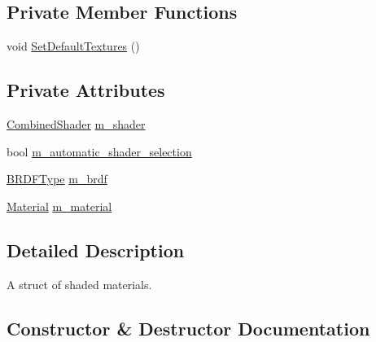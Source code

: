 \subsection*{Private Member Functions}
\begin{DoxyCompactItemize}
\item 
void \hyperlink{structmage_1_1_shaded_material_afbd4b9d4a2f348124c08c005a712477d}{Set\+Default\+Textures} ()
\end{DoxyCompactItemize}
\subsection*{Private Attributes}
\begin{DoxyCompactItemize}
\item 
\hyperlink{structmage_1_1_combined_shader}{Combined\+Shader} \hyperlink{structmage_1_1_shaded_material_a712d07ac1995ff592bbb8ab20a294270}{m\+\_\+shader}
\item 
bool \hyperlink{structmage_1_1_shaded_material_a744f6e4c0318f29f343039d6be072b66}{m\+\_\+automatic\+\_\+shader\+\_\+selection}
\item 
\hyperlink{namespacemage_ae7a7a03a7b34d7e2689689bb8295cd38}{B\+R\+D\+F\+Type} \hyperlink{structmage_1_1_shaded_material_a59a4b0ecb6ab1d60a285e0f1f69b5e36}{m\+\_\+brdf}
\item 
\hyperlink{structmage_1_1_material}{Material} \hyperlink{structmage_1_1_shaded_material_a319e1ca2103c50f84ce0605b08bd34b4}{m\+\_\+material}
\end{DoxyCompactItemize}


\subsection{Detailed Description}
A struct of shaded materials. 

\subsection{Constructor \& Destructor Documentation}
\hypertarget{structmage_1_1_shaded_material_a3b00f6ba8fc8a47e188b6adf28cc3460}{}\label{structmage_1_1_shaded_material_a3b00f6ba8fc8a47e188b6adf28cc3460} 
